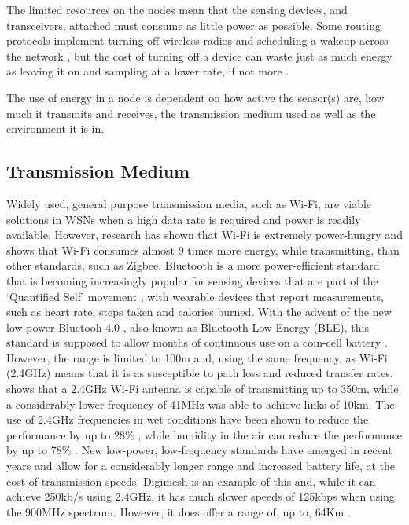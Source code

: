 	The limited resources on the nodes mean that the sensing devices, and transceivers, attached must consume as little power as possible. Some routing protocols implement turning off wireless radios and scheduling a wakeup across the network \cite{Vaidya2004}, but the cost of turning off a device can waste just as much energy as leaving it on and sampling at a lower rate, if not more \cite{Estrin2001}.

	The use of energy in a node is dependent on how active the sensor(s) are, how much it transmits and receives, the transmission medium used as well as the environment it is in.

\subsection{Transmission Medium}\label{bg:trans}
	Widely used, general purpose transmission media, such as Wi-Fi, are viable solutions in WSNs when a high data rate is required and power is readily available. However, research has shown that Wi-Fi is extremely power-hungry and \cite{Lee2007} shows that Wi-Fi consumes almost 9 times more energy, while transmitting, than other standards, such as Zigbee.
	Bluetooth is a more power-efficient standard that is becoming increasingly popular for sensing devices that are part of the `Quantified Self' movement \cite{Swan2012}, with wearable devices that report measurements, such as heart rate, steps taken and calories burned. With the advent of the new low-power Bluetooh 4.0 , also known as Bluetooth Low Energy (BLE), this standard is supposed to allow months of continuous use on a coin-cell battery \cite{bluetooth2012bluetooth}. However, the range is limited to 100m and, using the same frequency, as Wi-Fi (2.4GHz) means that it is as susceptible to path loss and reduced transfer rates.
	\cite{Zennaro} shows that a 2.4GHz Wi-Fi antenna is capable of transmitting up to 350m, while a considerably lower frequency of 41MHz was able to achieve links of 10km. The use of 2.4GHz frequencies in wet conditions have been shown to reduce the performance by up to 28\% \cite{Markham2010}, while humidity in the air can reduce the performance by up to 78\% \cite{Figueiredo2009}.
	New low-power, low-frequency standards have emerged in recent years and allow for a considerably longer range and increased battery life, at the cost of transmission speeds. Digimesh is an example of this and, while it can achieve 250kb/s using 2.4GHz, it has much slower speeds of 125kbps when using the 900MHz spectrum. However, it does offer a range of, up to, 64Km \cite{Bayat2012}.

